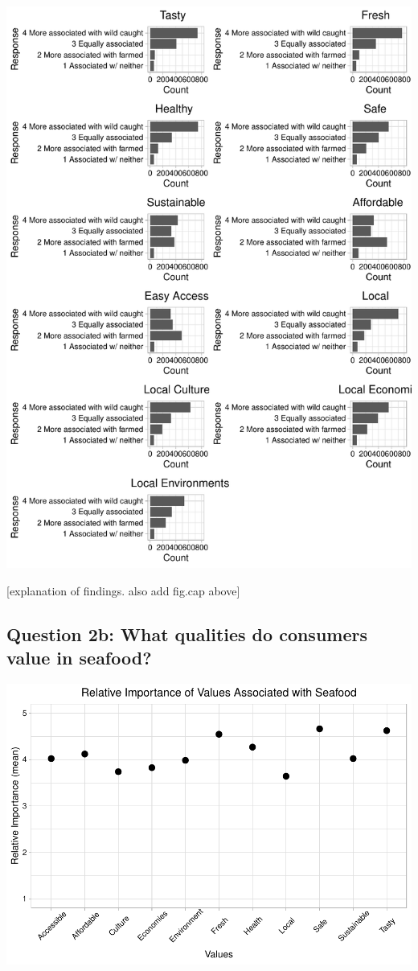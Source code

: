 \documentclass[
  12pt,
]{article}
\begin{document}
\includegraphics{Final_rmd_files/figure-latex/qualities-1.pdf}

{[}explanation of findings. also add fig.cap above{]}

\hypertarget{question-2b-what-qualities-do-consumers-value-in-seafood}{%
\subsection{Question 2b: What qualities do consumers value in
seafood?}\label{question-2b-what-qualities-do-consumers-value-in-seafood}}

\includegraphics{Final_rmd_files/figure-latex/importance-1.pdf}
\end{document}
